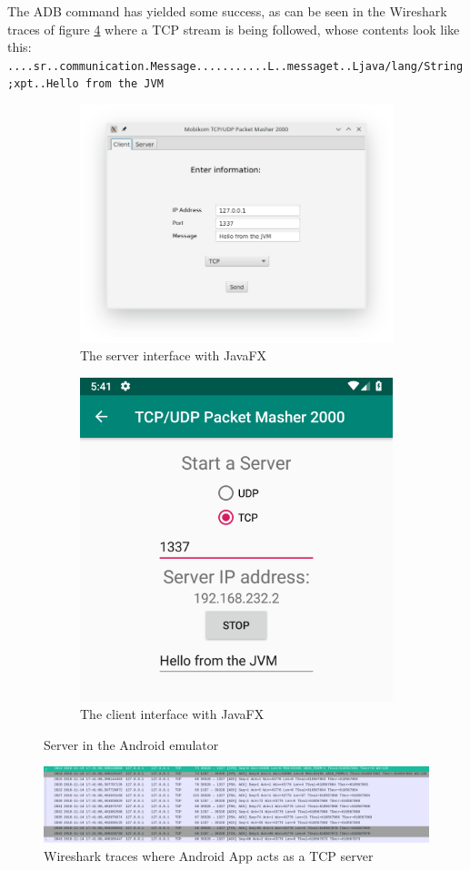 The ADB command has yielded some success, as can be seen in the Wireshark traces of figure \ref{fig:wire1} where a TCP stream is being followed, whose contents look like this:\\
\texttt{....sr..communication.Message...........L..messaget..Ljava/lang/String;xpt..Hello from the JVM}

\begin{figure}[H]
	\centering
	\begin{subfigure}{.49\textwidth}
		\centering
		\includegraphics[width=1\linewidth]{images/task3/desktopTCP.png}
		\caption{The server interface with JavaFX}
		\label{fig:desktopTCP}
	\end{subfigure}
\begin{subfigure}{.49\textwidth}
	\centering
	\includegraphics[width=0.74\linewidth]{images/task3/AndroidTCP.png}
	\caption{The client interface with JavaFX}
	\label{fig:androidTCP}
\end{subfigure}%
	\caption{Server in the Android emulator}
	\label{fig:emulator}
\end{figure}


\begin{figure}[H]
	\includegraphics[width=1\linewidth]{images/task3/wiresharkAndroidEmuServer.png}
	\caption{Wireshark traces where Android App acts as a TCP server}
	\label{fig:wire1}
\end{figure}